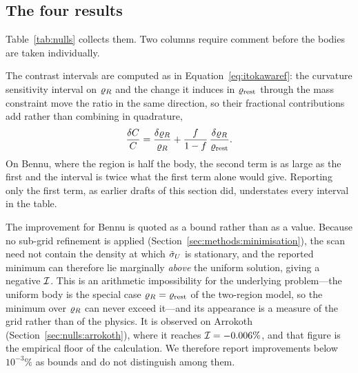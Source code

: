 \subsection{The four results}
\label{sec:nulls:table}

Table~\ref{tab:nulls} collects them. Two columns require comment before
the bodies are taken individually.

The contrast intervals are computed as in
Equation~\eqref{eq:itokawaref}: the curvature sensitivity interval on
$\varrho_{R}$ and the change it induces in $\varrho_{\mathrm{rest}}$ through the mass
constraint move the ratio in the same direction, so their fractional
contributions add rather than combining in quadrature,
%
\begin{equation}
\frac{\delta C}{C}
 = \frac{\delta\varrho_{R}}{\varrho_{R}}
 + \frac{f}{1-f}\,\frac{\delta\varrho_{R}}{\varrho_{\mathrm{rest}}} .
\label{eq:contrastinterval}
\end{equation}
%
On Bennu, where the region is half the body, the second term is as large
as the first and the interval is twice what the first term alone would
give. Reporting only the first term, as earlier drafts of this section
did, understates every interval in the table.

The improvement for Bennu is quoted as a bound rather than as a value.
Because no sub-grid refinement is applied
(Section~\ref{sec:methods:minimisation}), the scan need not contain the
density at which $\tilde{\sigma}_{U}$ is stationary, and the reported minimum can
therefore lie marginally \emph{above} the uniform solution, giving a
negative $\mathcal{I}$. This is an arithmetic impossibility for the
underlying problem---the uniform body is the special case
$\varrho_{R} = \varrho_{\mathrm{rest}}$ of the two-region model, so the minimum over
$\varrho_{R}$ can never exceed it---and its appearance is a measure of the
grid rather than of the physics. It is observed on Arrokoth
(Section~\ref{sec:nulls:arrokoth}), where it reaches
$\mathcal{I} = -0.006\%$, and that figure is the empirical floor of the
calculation. We therefore report improvements below $10^{-3}\%$ as
bounds and do not distinguish among them.


